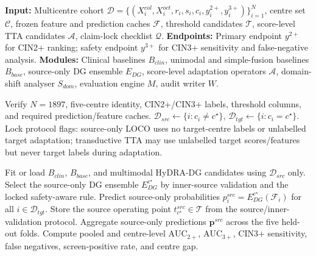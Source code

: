 \begin{algorithm}[htbp]
\small
\caption{Locked Route-B LOCO Benchmark and Score-Level Adaptation Analysis}
\label{alg:route_b_locked_loco}
\begin{algorithmic}[1]
    \State \textbf{Input:} Multicentre cohort $\mathcal{D}=\{(X^{col}_i,X^{oct}_i,r_i,s_i,c_i,y^{2+}_i,y^{3+}_i)\}_{i=1}^{N}$, centre set $\mathcal{C}$, frozen feature and prediction caches $\mathcal{F}$, threshold candidates $\mathcal{T}$, score-level TTA candidates $\mathcal{A}$, claim-lock checklist $\mathcal{Q}$.
    \State \textbf{Endpoints:} Primary endpoint $y^{2+}$ for CIN2+ ranking; safety endpoint $y^{3+}$ for CIN3+ sensitivity and false-negative analysis.
    \State \textbf{Modules:} Clinical baselines $B_{clin}$, unimodal and simple-fusion baselines $B_{base}$, source-only DG ensemble $E_{DG}$, score-level adaptation operators $\mathcal{A}$, domain-shift analyser $S_{dom}$, evaluation engine $M$, audit writer $W$.

    \Statex {}
    \State Verify $N=1897$, five-centre identity, CIN2+/CIN3+ labels, threshold columns, and required prediction/feature caches.
        \State $\mathcal{D}_{src}\gets\{i:c_i\neq c^{\star}\}$, \quad $\mathcal{D}_{tgt}\gets\{i:c_i=c^{\star}\}$.
        \State Lock protocol flags: source-only LOCO uses no target-centre labels or unlabelled target adaptation; transductive TTA may use unlabelled target scores/features but never target labels during adaptation.
    \EndFor

    \Statex {}
        \State Fit or load $B_{clin}$, $B_{base}$, and multimodal HyDRA-DG candidates using $\mathcal{D}_{src}$ only.
        \State Select the source-only DG ensemble $E_{DG}^{c^{\star}}$ by inner-source validation and the locked safety-aware rule.
        \State Predict source-only probabilities $p^{src}_i=E_{DG}^{c^{\star}}(\mathcal{F}_i)$ for all $i\in\mathcal{D}_{tgt}$.
        \State Store the source operating point $t^{src}_{c^{\star}}\in\mathcal{T}$ from the source/inner-validation protocol.
    \EndFor
    \State Aggregate source-only predictions $\mathbf{p}^{src}$ across the five held-out folds.
    \State Compute pooled and centre-level $\mathrm{AUC}_{2+}$, $\mathrm{AUC}_{3+}$, CIN3+ sensitivity, false negatives, screen-positive rate, and centre gap.


\end{algorithmic}
\end{algorithm}
